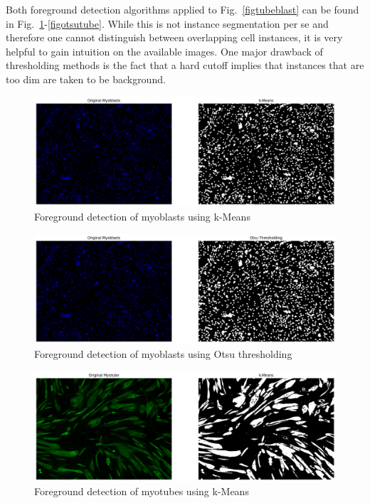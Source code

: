 Both foreground detection algorithms applied to Fig.~\ref{figtubeblast} can be found in Fig.~\ref{figkmblast}-\ref{figotsutube}. While this is not instance segmentation per se and therefore one cannot distinguish between overlapping cell instances, it is very helpful to gain intuition on the available images. One major drawback of thresholding methods is the fact that a hard cutoff implies that instances that are too dim are taken to be background.
\begin{figure}
	\centering
	\includegraphics[width=\textwidth]{"images/km_blast.png"}
	\caption[k-Means applied to myoblasts]{Foreground detection of myoblasts using k-Means}
	\label{figkmblast}
\end{figure}
\begin{figure}
	\centering
	\includegraphics[width=\textwidth]{"images/otsu_blast.png"}
	\caption[Otsu thresholding applied to myoblasts]{Foreground detection of myoblasts using Otsu thresholding}
	\label{figotsublast}
\end{figure}
\begin{figure}
	\centering
	\includegraphics[width=\textwidth]{"images/km_tube.png"}
	\caption[k-Means applied to myotubes]{Foreground detection of myotubes using k-Means}
	\label{figkmtube}
\end{figure}
